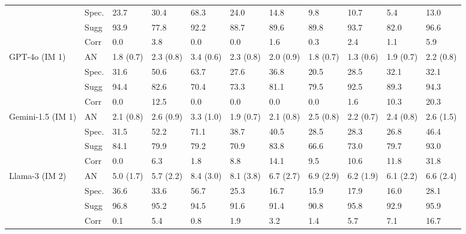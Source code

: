 \begin{table}[]
\begin{tabular}{lllllllllll}
                  &   Spec. &      23.7 &      30.4 &       68.3 &      24.0 &      14.8 &       9.8 &      10.7 &       5.4 &      13.0 \\
                  & Sugg &      93.9 &      77.8 &       92.2 &      88.7 &      89.6 &      89.8 &      93.7 &      82.0 &      96.6 \\
                  & Corr &       0.0 &       3.8 &        0.0 &       0.0 &       1.6 &       0.3 &       2.4 &       1.1 &       5.9 \\
    GPT-4o (IM 1) &         AN & 1.8 (0.7) & 2.3 (0.8) &  3.4 (0.6) & 2.3 (0.8) & 2.0 (0.9) & 1.8 (0.7) & 1.3 (0.6) & 1.9 (0.7) & 2.2 (0.8) \\
                  &   Spec. &      31.6 &      50.6 &       63.7 &      27.6 &      36.8 &      20.5 &      28.5 &      32.1 &      32.1 \\
                  & Sugg &      94.4 &      82.6 &       70.4 &      73.3 &      81.1 &      79.5 &      92.5 &      89.3 &      94.3 \\
                  & Corr &       0.0 &      12.5 &        0.0 &       0.0 &       0.0 &       0.0 &       1.6 &      10.3 &      20.3 \\
Gemini-1.5 (IM 1) &         AN & 2.1 (0.8) & 2.6 (0.9) &  3.3 (1.0) & 1.9 (0.7) & 2.1 (0.8) & 2.5 (0.8) & 2.2 (0.7) & 2.4 (0.8) & 2.6 (1.5) \\
                  &   Spec. &      31.5 &      52.2 &       71.1 &      38.7 &      40.5 &      28.5 &      28.3 &      26.8 &      46.4 \\
                  & Sugg &      84.1 &      79.9 &       79.2 &      70.9 &      83.8 &      66.6 &      73.0 &      79.7 &      93.0 \\
                  & Corr &       0.0 &       6.3 &        1.8 &       8.8 &      14.1 &       9.5 &      10.6 &      11.8 &      31.8 \\
   Llama-3 (IM 2) &         AN & 5.0 (1.7) & 5.7 (2.2) &  8.4 (3.0) & 8.1 (3.8) & 6.7 (2.7) & 6.9 (2.9) & 6.2 (1.9) & 6.1 (2.2) & 6.6 (2.4) \\
                  &   Spec. &      36.6 &      33.6 &       56.7 &      25.3 &      16.7 &      15.9 &      17.9 &      16.0 &      28.1 \\
                  & Sugg &      96.8 &      95.2 &       94.5 &      91.6 &      91.4 &      90.8 &      95.8 &      92.9 &      95.9 \\
                  & Corr &       0.1 &       5.4 &        0.8 &       1.9 &       3.2 &       1.4 &       5.7 &       7.1 &      16.7 \\

\end{tabular}
\end{table}
